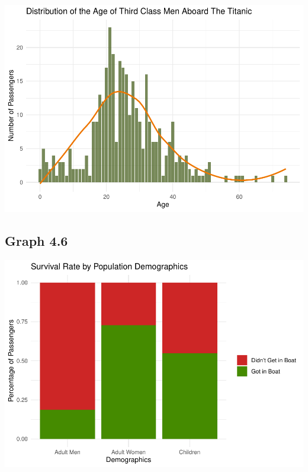 \documentclass[
  11pt,
]{article}
\begin{document}
\includegraphics{README_files/figure-latex/unnamed-chunk-6-1.pdf}

\hypertarget{graph-4.6}{%
\subsection{Graph 4.6}\label{graph-4.6}}

\includegraphics{README_files/figure-latex/unnamed-chunk-7-1.pdf}
\end{document}
